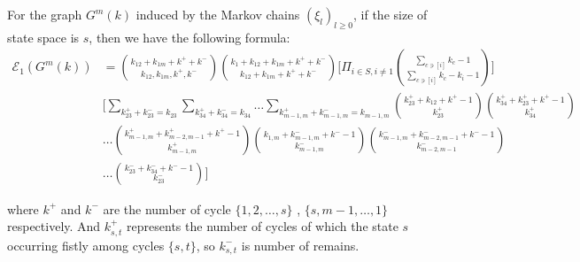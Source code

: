 \documentclass[11pt,en,cite=authoryear]{elegantpaper}
\begin{document}
\begin{theorem}
    For the graph $G^m(k)$ induced by the Markov chains $(\xi_l)_{l\ge 0}$, if the size of state space is $s$, then we have the following formula:
    \begin{align*}
        \mathcal{E}_1 (G^m(k)) &= 
        \binom{k_{12}+k_{1m}+k^{+}+k^{-}}{k_{12}, k_{1m}, k^{+}, k^{-}} 
        \binom{k_{1}+k_{12}+k_{1m}+k^{+}+k^{-}}{k_{12}+k_{1m}+k^{+}+k^{-}}
        \biggl[\Pi_{i\in S, i\neq 1} \binom{\sum_{c \ni [i]} k_{c} - 1}{\sum_{c \ni [i]} k_{c} - k_{i} - 1}\biggr]\\
        &\biggl[\sum_{k_{23}^{+}+k_{23}^{-}=k_{23}} \sum_{k_{34}^{+}+k_{34}^{-}=k_{34}}
        \dots \sum_{k_{m-1,m}^{+}+k_{m-1,m}^{-}=k_{m-1,m}}
        \binom{k_{23}^{+}+k_{12}+k^{+}-1}{k_{23}^{+}} \binom{k_{34}^{+}+k_{23}^{+}+k^{+}-1}{k_{34}^{+}} \\
        &\dots \binom{k_{m-1, m}^{+}+ k^{+}_{m-2, m-1} + k^{+}  -1}{k_{m-1, m}^{+}} \binom{k_{1, m} + k_{m-1, m}^{-} + k^{-} -1}{k_{m-1, m}^{-}} \binom{k_{m-1, m}^{-} + k_{m-2, m-1}^{-} + k^{-} - 1}{k_{m-2, m-1}^{-}} \\
        &\dots \binom{k_{23}^{-} + k_{34}^{-} + k^{-} - 1}{k_{23}^{-}}\biggr]
    \end{align*}

    where $k^{+}$ and $k^{-}$ are the number of cycle $\{1, 2, \dots, s\}$ , $\{s, m-1, \dots, 1\}$ respectively. And $k_{s, t}^{+}$ represents the number of cycles of which the state $s$ occurring fistly among cycles $\{s, t\}$, so $k_{s, t}^{-}$ is number of remains.
\end{theorem}
\end{document}
